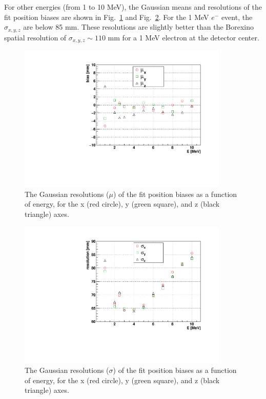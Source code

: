 For other energies (from 1 to 10 MeV), the Gaussian means and resolutions of the fit position biases are shown in Fig.~\ref{fig:scintBiasVsE} and Fig.~\ref{fig:scintResolVsE}. For the 1 MeV $e^-$ event, the $\sigma_{x,y,z}$ are below 85 mm. These resolutions are slightly better than the Borexino spatial resolution of $\sigma_{x,y,z} \sim 110$ mm for a 1 MeV electron at the detector center\cite{borexino2020experimental}.

\begin{figure}[!htb]
	\centering
	\includegraphics[width=10cm]{fullScintBiasVsE.pdf}
	\caption[The Gaussian biases ($\mu$) of the \texttt{MP scint fitter} fit position biases as a function of energy, for the x, y, and z axes.]{The Gaussian resolutions ($\mu$) of the fit position biases as a function of energy, for the x (red circle), y (green square), and z (black triangle) axes.}
	\label{fig:scintBiasVsE}
\end{figure}

\begin{figure}[!htb]
	\centering
	\includegraphics[width=10cm]{fullScintResolVsE.pdf}
	\caption[The Gaussian resolutions ($\sigma$) of the \texttt{MP scint fitter} fit position biases as a function of energy, for the x, y, and z axes.]{The Gaussian resolutions ($\sigma$) of the fit position biases as a function of energy, for the x (red circle), y (green square), and z (black triangle) axes.}
	\label{fig:scintResolVsE}
\end{figure}

